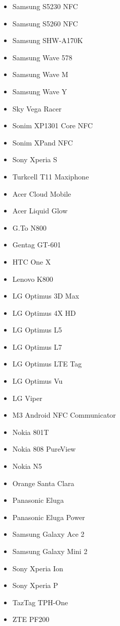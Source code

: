 \begin{itemize}
\item Samsung S5230 NFC
\item Samsung S5260 NFC
\item Samsung SHW-A170K
\item Samsung Wave 578
\item Samsung Wave M
\item Samsung Wave Y
\item Sky Vega Racer
\item Sonim XP1301 Core NFC
\item Sonim XPand NFC
\item Sony Xperia S
\item Turkcell T11 Maxiphone
\item Acer Cloud Mobile
\item Acer Liquid Glow
\item G.To N800
\item Gentag GT-601
\item HTC One X
\item Lenovo K800
\item LG Optimus 3D Max
\item LG Optimus 4X HD
\item LG Optimus L5
\item LG Optimus L7
\item LG Optimus LTE Tag
\item LG Optimus Vu
\item LG Viper
\item M3 Android NFC Communicator
\item Nokia 801T
\item Nokia 808 PureView
\item Nokia N5
\item Orange Santa Clara
\item Panasonic Eluga
\item Panasonic Eluga Power
\item Samsung Galaxy Ace 2
\item Samsung Galaxy Mini 2
\item Sony Xperia Ion
\item Sony Xperia P
\item TazTag TPH-One
\item ZTE PF200
\end{itemize}

